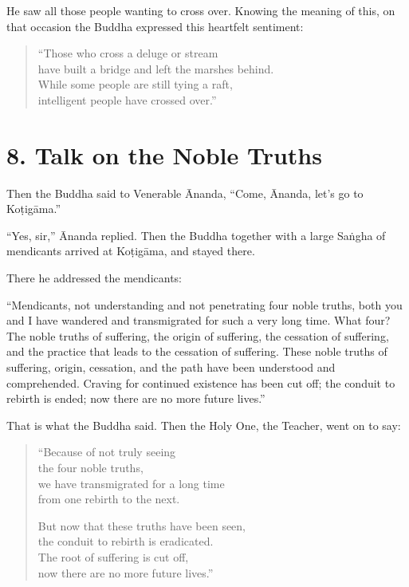 \documentclass[12pt,openany]{book}%
\begin{document}
He saw all those people wanting to cross over. Knowing the meaning of this, on that occasion the Buddha expressed this heartfelt sentiment: 

\begin{verse}%
“Those who cross a deluge or stream \\
have built a bridge and left the marshes behind. \\
While some people are still tying a raft, \\
intelligent people have crossed over.” 

%
\end{verse}

\section*{8. Talk on the Noble Truths }

Then the Buddha said to Venerable Ānanda, “Come, Ānanda, let’s go to \textsanskrit{Koṭigāma}.” 

“Yes, sir,” Ānanda replied. Then the Buddha together with a large \textsanskrit{Saṅgha} of mendicants arrived at \textsanskrit{Koṭigāma}, and stayed there. 

There he addressed the mendicants: 

“Mendicants, not understanding and not penetrating four noble truths, both you and I have wandered and transmigrated for such a very long time. What four? The noble truths of suffering, the origin of suffering, the cessation of suffering, and the practice that leads to the cessation of suffering. These noble truths of suffering, origin, cessation, and the path have been understood and comprehended. Craving for continued existence has been cut off; the conduit to rebirth is ended; now there are no more future lives.” 

That is what the Buddha said. Then the Holy One, the Teacher, went on to say: 

\begin{verse}%
“Because of not truly seeing \\
the four noble truths, \\
we have transmigrated for a long time \\
from one rebirth to the next. 

But now that these truths have been seen, \\
the conduit to rebirth is eradicated. \\
The root of suffering is cut off, \\
now there are no more future lives.” 

%
\end{verse}
\end{document}
